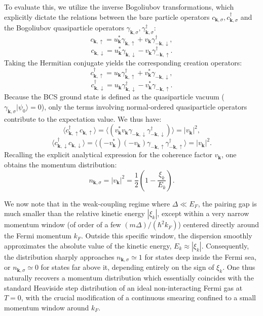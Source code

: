 To evaluate this, we utilize the inverse Bogoliubov transformations, which explicitly dictate the relations between the bare particle operators \( c_{\mathbf{k},\sigma}, c_{\mathbf{k},\sigma}^\dagger \) and the Bogoliubov quasiparticle operators \( \gamma_{\mathbf{k},\sigma}, \gamma_{\mathbf{k},\sigma}^\dagger \):
\[
    c_{\mathbf{k},\uparrow} = u_{\mathbf{k}}^* \gamma_{\mathbf{k},\uparrow} + v_{\mathbf{k}} \gamma_{-\mathbf{k},\downarrow}^\dagger,
\]
\[
    c_{\mathbf{k},\downarrow} = u_{\mathbf{k}}^* \gamma_{\mathbf{k},\downarrow} - v_{\mathbf{k}} \gamma_{-\mathbf{k},\uparrow}^\dagger.
\]
Taking the Hermitian conjugate yields the corresponding creation operators:
\[
    c_{\mathbf{k},\uparrow}^\dagger = u_{\mathbf{k}} \gamma_{\mathbf{k},\uparrow}^\dagger + v_{\mathbf{k}}^* \gamma_{-\mathbf{k},\downarrow},
\]
\[
    c_{\mathbf{k},\downarrow}^\dagger = u_{\mathbf{k}} \gamma_{\mathbf{k},\downarrow}^\dagger - v_{\mathbf{k}}^* \gamma_{-\mathbf{k},\uparrow}.
\]
Because the BCS ground state is defined as the quasiparticle vacuum (\( \gamma_{\mathbf{k},\sigma} |\psi_0\rangle = 0 \)), only the terms involving normal-ordered quasiparticle operators contribute to the expectation value. We thus have:
\[
    \langle c_{\mathbf{k},\uparrow}^\dagger c_{\mathbf{k},\uparrow} \rangle = \langle (v_{\mathbf{k}}^* v_{\mathbf{k}} \gamma_{-\mathbf{k},\downarrow} \gamma_{-\mathbf{k},\downarrow}^\dagger) \rangle = |v_{\mathbf{k}}|^2,
\]
\[
    \langle c_{\mathbf{k},\downarrow}^\dagger c_{\mathbf{k},\downarrow} \rangle = \langle (-v_{\mathbf{k}}^*)(-v_{\mathbf{k}}) \gamma_{-\mathbf{k},\uparrow} \gamma_{-\mathbf{k},\uparrow}^\dagger \rangle = |v_{\mathbf{k}}|^2.
\]
Recalling the explicit analytical expression for the coherence factor \( v_{\mathbf{k}} \), one obtains the momentum distribution:
\begin{equation} \label{eq:momentum_distribution}
    n_{\mathbf{k},\sigma} = |v_{\mathbf{k}}|^2 = \frac{1}{2} \left( 1 - \frac{\xi_k}{E_k} \right).
\end{equation}


We now note that in the weak-coupling regime where \( \Delta \ll E_F \), the pairing gap is much smaller than the relative kinetic energy \( |\xi_k| \), except within a very narrow momentum window (of order of a few \( (m\Delta)/(\hbar^2 k_F) \)) centered directly around the Fermi momentum \( k_F \). Outside this specific window, the dispersion smoothly approximates the absolute value of the kinetic energy, \( E_k \approx |\xi_k| \). Consequently, the distribution sharply approaches \( n_{\mathbf{k},\sigma} \simeq 1 \) for states deep inside the Fermi sea, or \( n_{\mathbf{k},\sigma} \simeq 0 \) for states far above it, depending entirely on the sign of \( \xi_k \). One thus naturally recovers a momentum distribution which essentially coincides with the standard Heaviside step distribution of an ideal non-interacting Fermi gas at \( T = 0 \), with the crucial modification of a continuous smearing confined to a small momentum window around \( k_F \).

